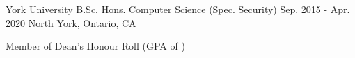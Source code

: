 

\begin{cventries}

  \cventry
    {York University} %
    {B.Sc. Hons. Computer Science (Spec. Security)} %
    {Sep. 2015 - Apr. 2020} %
    {North York, Ontario, CA} %
    {
      \begin{cvitems} %
        \item {Member of Dean's Honour Roll (GPA of )}
        \item {}
      \end{cvitems} 
    }

\end{cventries}
